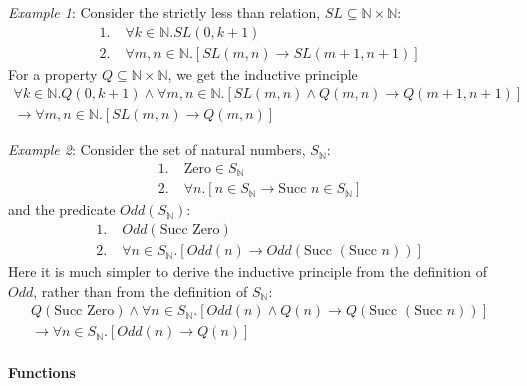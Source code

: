 \documentclass[10pt,twoside,twocolumn]{article}
\begin{document}
\emph{Example 1}: Consider the strictly less than relation, $SL\subseteq\mathbb{N}\times\mathbb{N}$:
\begin{align*}
1.\; & \forall k\in\mathbb{N}.SL\left(0,k+1\right)\\
2.\; & \forall m,n\in\mathbb{N}.\left[SL\left(m,n\right)\rightarrow SL\left(m+1,n+1\right)\right]
\end{align*}
For a property $Q\subseteq\mathbb{N}\times\mathbb{N}$, we get the
inductive principle
\begin{multline*}
\forall k\in\mathbb{N}.Q\left(0,k+1\right)\land\forall m,n\in\mathbb{N}.\left[SL\left(m,n\right)\land Q\left(m,n\right)\rightarrow Q\left(m+1,n+1\right)\right]\\
\rightarrow\forall m,n\in\mathbb{N}.\left[SL\left(m,n\right)\rightarrow Q\left(m,n\right)\right]
\end{multline*}


\emph{Example 2}: Consider the set of natural numbers, $S_{\mathbb{N}}$:
\begin{align*}
1.\; & \mbox{Zero}\in S_{\mathbb{N}}\\
2.\; & \forall n.\left[n\in S_{\mathbb{N}}\rightarrow\mbox{Succ }n\in S_{\mathbb{N}}\right]
\end{align*}
and the predicate $Odd\left(S_{\mathbb{N}}\right)$:
\begin{align*}
1.\; & Odd\left(\mbox{Succ Zero}\right)\\
2.\; & \forall n\in S_{\mathbb{N}}.\left[Odd\left(n\right)\rightarrow Odd\left(\mbox{Succ }\left(\mbox{Succ }n\right)\right)\right]
\end{align*}
Here it is much simpler to derive the inductive principle from the
definition of $Odd$, rather than from the definition of $S_{\mathbb{N}}$:
\begin{multline*}
Q\left(\mbox{Succ Zero}\right)\land\forall n\in S_{\mathbb{N}}.\left[Odd\left(n\right)\land Q\left(n\right)\rightarrow Q\left(\mbox{Succ }\left(\mbox{Succ }n\right)\right)\right]\\
\rightarrow\forall n\in S_{\mathbb{N}}.\left[Odd\left(n\right)\rightarrow Q\left(n\right)\right]
\end{multline*}



\paragraph{Functions}
\end{document}
